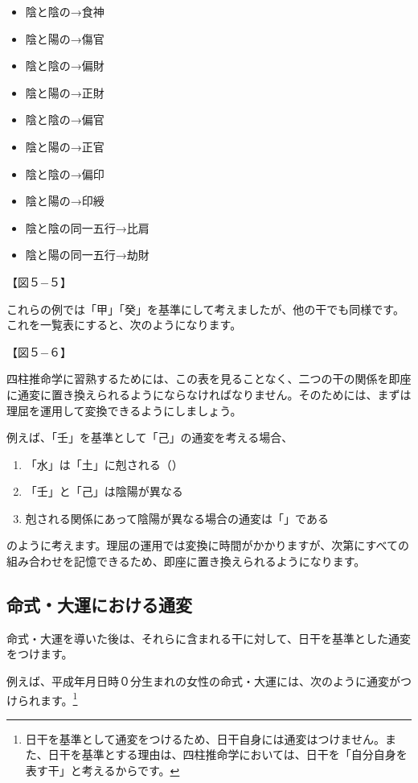 \documentclass[a5paper,11pt,dvipdfmx]{tarticle}
\begin{document}
\begin{itemize}
\item 陰と陰の→食神
\item 陰と陽の→傷官
\item 陰と陰の→偏財
\item 陰と陽の→正財
\item 陰と陰の→偏官
\item 陰と陽の→正官
\item 陰と陰の→偏印
\item 陰と陽の→印綬
\item 陰と陰の同一五行→比肩
\item 陰と陽の同一五行→劫財
\end{itemize}

【図５−５】

これらの例では「甲」「癸」を基準にして考えましたが、他の干でも同様です。これを一覧表にすると、次のようになります。

【図５−６】

四柱推命学に習熟するためには、この表を見ることなく、二つの干の関係を即座に通変に置き換えられるようにならなければなりません。そのためには、まずは理屈を運用して変換できるようにしましょう。

例えば、「壬」を基準として「己」の通変を考える場合、

\begin{enumerate}
\item 「水」は「土」に剋される（）
\item 「壬」と「己」は陰陽が異なる
\item 剋される関係にあって陰陽が異なる場合の通変は「」である
\end{enumerate}
のように考えます。理屈の運用では変換に時間がかかりますが、次第にすべての組み合わせを記憶できるため、即座に置き換えられるようになります。

\subsection{命式・大運における通変}
命式・大運を導いた後は、それらに含まれる干に対して、日干を基準とした通変をつけます。

例えば、平成年月日時０分生まれの女性の命式・大運には、次のように通変がつけられます。\footnote{日干を基準として通変をつけるため、日干自身には通変はつけません。また、日干を基準とする理由は、四柱推命学においては、日干を「自分自身を表す干」と考えるからです。}
\end{document}
